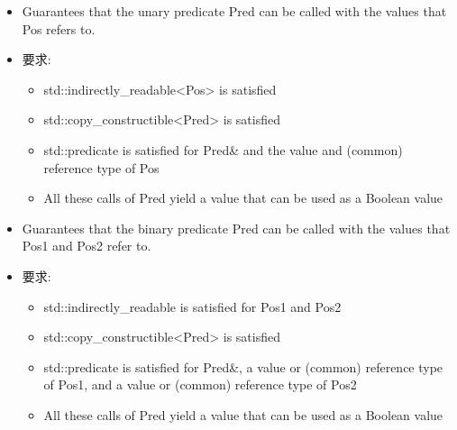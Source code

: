 
\begin{itemize}
\item
Guarantees that the unary predicate Pred can be called with the values that Pos refers to.

\item
要求:
\begin{itemize}
\item
std::indirectly\_readable<Pos> is satisfied

\item
std::copy\_constructible<Pred> is satisfied

\item
std::predicate is satisfied for Pred\& and the value and (common) reference type of Pos

\item
All these calls of Pred yield a value that can be used as a Boolean value
\end{itemize}
\end{itemize}


\begin{itemize}
\item
Guarantees that the binary predicate Pred can be called with the values that Pos1 and Pos2 refer to.

\item
要求:
\begin{itemize}
\item
std::indirectly\_readable is satisfied for Pos1 and Pos2

\item
std::copy\_constructible<Pred> is satisfied

\item
std::predicate is satisfied for Pred\&, a value or (common) reference type of Pos1, and a value or (common) reference type of Pos2

\item
All these calls of Pred yield a value that can be used as a Boolean value
\end{itemize}
\end{itemize}


